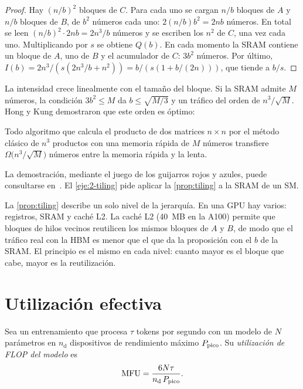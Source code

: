 \begin{proof}
Hay $(n/b)^{2}$ bloques de $C$. Para cada uno se cargan $n/b$ bloques de $A$ y $n/b$ bloques de $B$, de $b^{2}$ números cada uno: $2(n/b)b^{2}=2nb$ números. En total se leen $(n/b)^{2}\cdot 2nb=2n^{3}/b$ números y se escriben los $n^{2}$ de $C$, una vez cada uno. Multiplicando por $s$ se obtiene $Q(b)$. En cada momento la SRAM contiene un bloque de $A$, uno de $B$ y el acumulador de $C$: $3b^{2}$ números. Por último, $I(b)=2n^{3}/(s(2n^{3}/b+n^{2}))=b/(s(1+b/(2n)))$, que tiende a $b/s$.
\end{proof}

La intensidad crece linealmente con el tamaño del bloque. Si la SRAM admite $M$ números, la condición $3b^{2}\le M$ da $b\le\sqrt{M/3}$ y un tráfico del orden de $n^{3}/\sqrt{M}$. Hong y Kung demostraron que este orden es óptimo:

\begin{teorema}\label{teo:hongkung}
Todo algoritmo que calcula el producto de dos matrices $n\times n$ por el método clásico de $n^{3}$ productos con una memoria rápida de $M$ números transfiere $\Omega\bigl(n^{3}/\sqrt{M}\bigr)$ números entre la memoria rápida y la lenta.
\end{teorema}

La demostración, mediante el juego de los guijarros rojos y azules, puede consultarse en~\cite{hongkung}. El \cref{eje:2-tiling} pide aplicar la \cref{prop:tiling} a la SRAM de un SM.

\begin{observacion}
La \cref{prop:tiling} describe un solo nivel de la jerarquía. En una GPU hay varios: registros, SRAM y caché L2. La caché L2 (40~MB en la A100) permite que bloques de hilos vecinos reutilicen los mismos bloques de $A$ y $B$, de modo que el tráfico real con la HBM es menor que el que da la proposición con el $b$ de la SRAM. El principio es el mismo en cada nivel: cuanto mayor es el bloque que cabe, mayor es la reutilización.
\end{observacion}

\section{Utilización efectiva}

\begin{definicion}\label{def:mfu}
Sea un entrenamiento que procesa $\tau$ tokens por segundo con un modelo de $N$ parámetros en $n_{\mathrm{d}}$ dispositivos de rendimiento máximo $P_{\mathrm{pico}}$. Su \emph{utilización de FLOP del modelo} es~\cite[§4.1 y apéndice~B]{palm}
\[
\mathrm{MFU}=\frac{6N\tau}{n_{\mathrm{d}}\,P_{\mathrm{pico}}}.
\]
\end{definicion}

